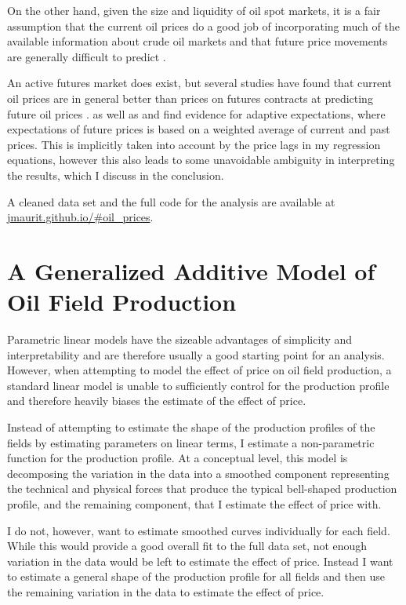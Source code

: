 \documentclass[11pt]{article}
\begin{document}
On the other hand, given the size and liquidity of oil spot markets, it is a fair assumption that the current oil prices do a good job of incorporating much of the available information about crude oil markets and that future price movements are generally difficult to predict \citep{hamilton_understanding_2008}.

An active futures market does exist, but several studies have found that current oil prices are in general better than prices on futures contracts at predicting future oil prices \citep{alquist_what_2010, chinn_predictive_2005}.  \citet{mohn_investment_2008} as well as \citet{pesaran_econometric_1990} and \citet{farzin_impact_2001} find evidence for adaptive expectations, where expectations of future prices is based on a weighted average of current and past prices. This is implicitly taken into account by the price lags in my regression equations, however this also leads to some unavoidable ambiguity in interpreting the results, which I discuss in the conclusion. 

A cleaned data set and the full code for the analysis are available at \url{jmaurit.github.io/#oil_prices}.

\section{A Generalized Additive Model of Oil Field Production}
Parametric linear models have the sizeable advantages of simplicity and interpretability and are therefore usually a good starting point for an analysis. However, when attempting to model the effect of price on oil field production, a standard linear model is unable to sufficiently control for the production profile and therefore heavily biases the estimate of the effect of price.
  
Instead of attempting to estimate the shape of the production profiles of the fields by estimating parameters on linear terms, I estimate a non-parametric function for the production profile. At a conceptual level, this model is decomposing the variation in the data into a smoothed component representing the technical and physical forces that produce the typical bell-shaped production profile, and the remaining component, that I estimate the effect of price with.  

I do not, however, want to estimate smoothed curves individually for each field. While this would provide a good overall fit to the full data set, not enough variation in the data would be left to estimate the effect of price.  Instead I want to estimate a general shape of the production profile for all fields and then use the remaining variation in the data to estimate the effect of price.  
\end{document}
